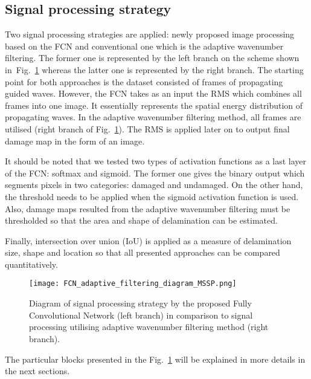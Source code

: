 \subsection{Signal processing strategy}
Two signal processing strategies are applied: newly proposed image processing based on the FCN and conventional one which is the adaptive wavenumber filtering.
The former one is represented by the left branch on the scheme shown in~Fig.~\ref{fig:sig_proc_strategy} whereas the latter one is represented by the right branch.
The starting point for both approaches is the dataset consisted of frames of propagating guided waves.
However, the FCN takes as an input the RMS which combines all frames into one image. 
It essentially represents the spatial energy distribution of propagating waves.
In the adaptive wavenumber filtering method, all frames are utilised (right branch of Fig.~\ref{fig:sig_proc_strategy}).
The RMS is applied later on to output final damage map in the form of an image.

It should be noted that we tested two types of activation functions as a last layer of the FCN: softmax and sigmoid.
The former one gives the binary output which segments pixels in two categories: damaged and undamaged.
On the other hand, the threshold needs to be applied when the sigmoid activation function is used.
Also, damage maps resulted from the adaptive wavenumber filtering must be thresholded so that the area and shape of delamination can be estimated.

Finally, intersection over union (IoU) is applied as a measure of delamination size, shape and location so that all presented approaches can be compared quantitatively. 
	\begin{figure}
		\centering
		\texttt{[image: FCN\_adaptive\_filtering\_diagram\_MSSP.png]}
		\caption{Diagram of signal processing strategy by the proposed Fully Convolutional Network (left branch) in comparison to signal processing utilising adaptive wavenumber filtering method (right branch). }
		\label{fig:sig_proc_strategy}
	\end{figure}
The particular blocks presented in the Fig.~\ref{fig:sig_proc_strategy} will be explained in more details in the next sections.